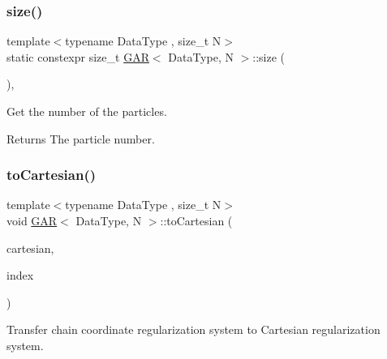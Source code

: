 \subsubsection{\texorpdfstring{size()}{size()}}
{\footnotesize\ttfamily template$<$typename Data\+Type , size\+\_\+t N$>$ \\
static constexpr size\+\_\+t \mbox{\hyperlink{class_g_a_r}{G\+AR}}$<$ Data\+Type, N $>$\+::size (\begin{DoxyParamCaption}{ }\end{DoxyParamCaption})\hspace{0.3cm}{\ttfamily [inline]}, {\ttfamily [static]}}



Get the number of the particles. 

\begin{DoxyReturn}{Returns}
The particle number. 
\end{DoxyReturn}
\mbox{\label{class_g_a_r_a2a282218e90ffb1a367da364b70e54a3}} 
\subsubsection{\texorpdfstring{to\+Cartesian()}{toCartesian()}}
{\footnotesize\ttfamily template$<$typename Data\+Type , size\+\_\+t N$>$ \\
void \mbox{\hyperlink{class_g_a_r}{G\+AR}}$<$ Data\+Type, N $>$\+::to\+Cartesian (\begin{DoxyParamCaption}\item[{\mbox{\hyperlink{class_g_a_r}{G\+AR}}$<$ Data\+Type, N $>$ \&}]{cartesian,  }\item[{\mbox{\hyperlink{class_g_a_r_aaf033049c0cd8f0f86a82b9595086fa5}{Index\+Array}} \&}]{index }\end{DoxyParamCaption})\hspace{0.3cm}{\ttfamily [inline]}}



Transfer chain coordinate regularization system to Cartesian regularization system. 

